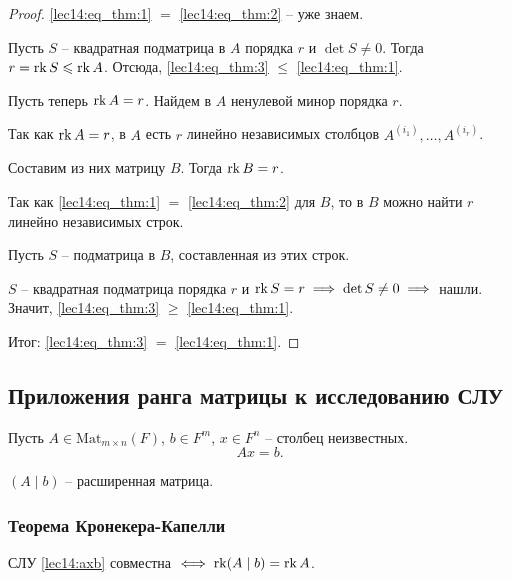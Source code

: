 \begin{proof}
    \ref{lec14:eq_thm:1} $=$ \ref{lec14:eq_thm:2} -- уже знаем.

    Пусть $S$ -- квадратная подматрица в $A$ порядка $r$ и $\det S \neq 0$.
    Тогда $r = \operatorname{\mathop{\mathrm{rk}}} S \leqslant \operatorname{\mathop{\mathrm{rk}}} A$.
    Отсюда, \ref{lec14:eq_thm:3} $\leq$ \ref{lec14:eq_thm:1}.

    \bigskip
    Пусть теперь $\operatorname{\mathop{\mathrm{rk}}} A = r$. Найдем в $A$ ненулевой минор порядка $r$.

    Так как $\operatorname{\mathop{\mathrm{rk}}} A = r$, в $A$ есть $r$ линейно независимых столбцов $A^{(i_1)}, \dots, A^{(i_r)}$. 

    Составим из них матрицу $B$. Тогда $\operatorname{\mathop{\mathrm{rk}}} B = r$.

    Так как \ref{lec14:eq_thm:1} $=$ \ref{lec14:eq_thm:2} для $B$, то в $B$ можно найти $r$ линейно независимых строк.

    Пусть $S$ -- подматрица в $B$, составленная из этих строк. 

    $S$ -- квадратная подматрица порядка $r$ и $\operatorname{\mathop{\mathrm{rk}}} S = r \implies \det S \neq 0 \implies $ нашли. Значит, \ref{lec14:eq_thm:3} $\geq$ \ref{lec14:eq_thm:1}.

    \bigskip
    Итог: \ref{lec14:eq_thm:3} $=$ \ref{lec14:eq_thm:1}.
\end{proof}


\subsection{Приложения ранга матрицы к исследованию СЛУ}

Пусть $A \in \text{Mat}_{m \times n}(F)$, $b \in F^m$, $x \in F^n$ -- столбец неизвестных.
\begin{equation*}
    \tag{$\star$}
    \label{lec14:axb}
    Ax = b
.\end{equation*}

$(A \mid b)$ -- расширенная матрица.

\subsubsection{Теорема Кронекера-Капелли}

\begin{theorem}
    СЛУ \eqref{lec14:axb} совместна $\iff \operatorname{\mathop{\mathrm{rk}}} (A \mid b) = \operatorname{\mathop{\mathrm{rk}}} A$.
\end{theorem}

